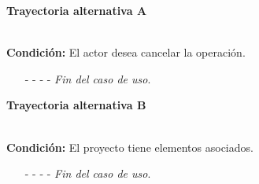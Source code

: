 	\hypertarget{CU2-3:TAA}{\textbf{Trayectoria alternativa A}}\\
	\noindent \textbf{Condición:} El actor desea cancelar la operación.
	\begin{enumerate}
		\UCpaso[\UCactor] Solicita cancelar la operación oprimiendo el botón  de la ventana emergente.
		\UCpaso[\UCsist] Muestra la pantalla .
		\item[- -] - - {\em {Fin del caso de uso}}.%
	\end{enumerate}

	\hypertarget{CU2-3:TAB}{\textbf{Trayectoria alternativa B}}\\
	\noindent \textbf{Condición:} El proyecto tiene elementos asociados.
	\begin{enumerate}
		\UCpaso[\UCsist] Muestra la pantalla  con el mensaje .
		\item[- -] - - {\em {Fin del caso de uso}}.%
	\end{enumerate}